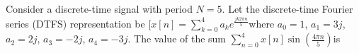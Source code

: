 \documentclass{article}
\begin{document}
Consider a discrete-time signal with period $N=5$. Let the discrete-time Fourier series (DTFS) representation be $[ x[n] = \sum\limits_{k=0}^{4} a_k e^{\frac{jk2\pi n}{5}} $where $a_0=1$, $a_1=3j$, $a_2=2j$, $a_3=-2j$, $a_4=-3j$. The value of the sum $\sum\limits_{n=0}^{4}x[n] \sin\left(\frac{4\pi n}{5}\right) $is
\end{document}
